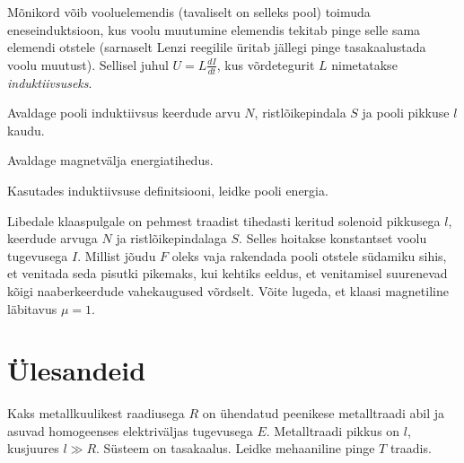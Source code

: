 \documentclass[a4paper,11pt,twocolumn]{article}
\begin{document}
Mõnikord võib vooluelemendis (tavaliselt on selleks pool) toimuda eneseinduktsioon, kus voolu muutumine elemendis tekitab pinge selle sama elemendi otstele (sarnaselt Lenzi reegilile üritab jällegi pinge tasakaalustada voolu muutust). Sellisel juhul $U=L\frac{dI}{dt}$, kus võrdetegurit $L$ nimetatakse \textit{induktiivsuseks}.

\begin{question}
    Avaldage pooli induktiivsus keerdude arvu $N$, ristlõikepindala $S$ ja pooli pikkuse $l$ kaudu.
\end{question}

\begin{question}
    Avaldage magnetvälja energiatihedus.
    \begin{hint}
        Kasutades induktiivsuse definitsiooni, leidke pooli energia.
    \end{hint}
\end{question}

\begin{question}[Lõppv 2008, G10]
    Libedale klaaspulgale on pehmest traadist tihedasti keritud solenoid pikkusega $l$, keerdude arvuga $N$ ja ristlõikepindalaga $S$. Selles hoitakse konstantset voolu tugevusega $I$. Millist jõudu $F$ oleks vaja rakendada pooli otstele südamiku sihis, et venitada seda pisutki pikemaks, kui kehtiks eeldus, et venitamisel suurenevad kõigi naaberkeerdude vahekaugused võrdselt. Võite lugeda, et klaasi magnetiline läbitavus $\mu = 1$.
\end{question}

\section{Ülesandeid}

\begin{question}[Lahtine 2016, V10]
    Kaks metallkuulikest raadiusega $R$ on ühendatud peenikese metalltraadi abil ja asuvad homogeenses elektriväljas tugevusega $E$. Metalltraadi pikkus on $l$, kusjuures $l \gg R$. Süsteem on tasakaalus. Leidke mehaaniline pinge $T$ traadis.
\end{question}
\end{document}

